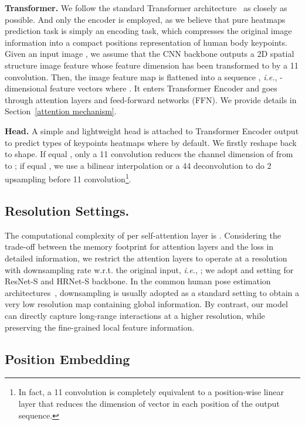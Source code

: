 \documentclass{article}
\begin{document}
{\bf Transformer.} We follow the standard Transformer architecture~\cite{vaswani2017attention} as closely as possible. And only the encoder is employed, as we believe that pure heatmaps prediction task is simply an encoding task, which compresses the original image information into a compact positions representation of human body keypoints. Given an input image , we assume that the CNN backbone outputs a 2D spatial structure image feature  whose feature dimension has been transformed to  by a 11 convolution. Then, the image feature map is flattened into a sequence , \emph{i.e.},  -dimensional feature vectors where . It enters Transformer Encoder and goes through  attention layers and feed-forward networks (FFN). We provide details in Section~\ref{attention mechanism}.

{\bf Head.} A simple and lightweight head is attached to Transformer Encoder output  to predict  types of keypoints heatmaps  where  by default. We firstly reshape  back to  shape. If  equal , only a 11 convolution reduces the channel dimension of  from  to ; if  equal , we use a bilinear interpolation or a 44 deconvolution to do 2 upsampling before 11 convolution\footnote{In fact, a 11 convolution is completely equivalent to a position-wise linear layer that reduces the dimension of vector in each position of the output sequence.}. 

\subsection{Resolution Settings.}

The computational complexity of per self-attention layer is . Considering the trade-off between the memory footprint for attention layers and the loss in detailed information, we restrict the attention layers to operate at a resolution with  downsampling rate w.r.t. the original input, \emph{i.e.}, ; we adopt  and  setting for ResNet-S and HRNet-S backbone. In the common human pose estimation architectures~\cite{wei2016convolutional, newell2016stacked, xiao2018simple, sun2019hrnet},  downsampling is usually adopted as a standard setting to obtain a very low resolution map containing global information. By contrast, our model can directly capture long-range interactions at a higher resolution, while preserving the fine-grained local feature information.



\subsection{Position Embedding}
\end{document}

